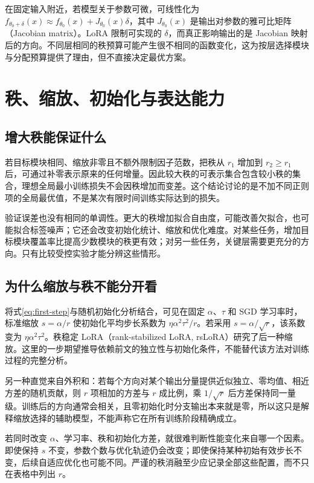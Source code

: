 \documentclass[UTF8,12pt,a4paper,fontset=fandol]{ctexart}
\begin{document}
在固定输入附近，若模型关于参数可微，可线性化为
$f_{\theta_0+\delta}(x)\approx f_{\theta_0}(x)+J_{\theta_0}(x)\delta$，其中 $J_{\theta_0}(x)$ 是输出对参数的雅可比矩阵（Jacobian matrix）。LoRA 限制可实现的 $\delta$，而真正影响输出的是 Jacobian 映射后的方向。不同层相同的秩预算可能产生很不相同的函数变化，这为按层选择模块与分配预算提供了理由，但不直接决定最优方案。

\section{秩、缩放、初始化与表达能力}
\label{sec:rank-scaling}

\subsection{增大秩能保证什么}

若目标模块相同、缩放非零且不额外限制因子范数，把秩从 $r_1$ 增加到 $r_2\geq r_1$ 后，可通过补零表示原来的任何增量。因此较大秩的可表示集合包含较小秩的集合，理想全局最小训练损失不会因秩增加而变差。这个结论讨论的是不加不同正则项的全局最优值，不是某次有限时间训练实际达到的损失。

验证误差也没有相同的单调性。更大的秩增加拟合自由度，可能改善欠拟合，也可能拟合标签噪声；它还会改变初始化统计、缩放和优化难度。对某些任务，增加目标模块覆盖率比提高少数模块的秩更有效；对另一些任务，关键层需要更充分的方向。只有比较受控实验才能分辨这些情形。

\subsection{为什么缩放与秩不能分开看}

将式\eqref{eq:first-step}与随机初始化分析结合，可见在固定 $\alpha$、$\tau$ 和 SGD 学习率时，标准缩放 $s=\alpha/r$ 使初始化平均步长系数为
$\eta\alpha^2\tau^2/r$。若采用 $s=\alpha/\sqrt r$，该系数变为
$\eta\alpha^2\tau^2$。秩稳定 LoRA（rank-stabilized LoRA, rsLoRA）研究了后一种缩放\cite{kalajdzievski2023}。这里的一步期望推导依赖前文的独立性与初始化条件，不能替代该方法对训练过程的完整分析。

另一种直觉来自外积和：若每个方向对某个输出分量提供近似独立、零均值、相近方差的随机贡献，则 $r$ 项相加的方差与 $r$ 成比例，乘 $1/\sqrt r$ 后方差保持同一量级。训练后的方向通常会相关，且零初始化时分支输出本来就是零，所以这只是解释缩放选择的辅助模型，不能声称它在所有训练阶段精确成立。

若同时改变 $\alpha$、学习率、秩和初始化方差，就很难判断性能变化来自哪一个因素。即使保持 $s$ 不变，参数个数与优化轨迹仍会改变；即使保持某种初始有效步长不变，后续自适应优化也可能不同。严谨的秩消融至少应记录全部这些配置，而不只在表格中列出 $r$。
\end{document}
